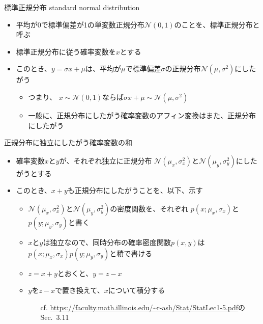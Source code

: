 \documentclass[aspectratio=169,unicode,dvipdfmx,14pt]{beamer}
\begin{document}
\begin{frame}{標準正規分布 standard normal distribution}
\begin{itemize}
\item 平均が0で標準偏差が1の単変数正規分布$\mathcal{N}(0,1)$のことを、標準正規分布と呼ぶ
\item 標準正規分布に従う確率変数を$x$とする
\item このとき、$y=\sigma x+\mu$は、平均が$\mu$で標準偏差$\sigma$の正規分布$\mathcal{N}(\mu,\sigma^2)$にしたがう
\begin{itemize}
\item つまり、 $x\sim\mathcal{N}(0,1)$ならば$\sigma x + \mu\sim\mathcal{N}(\mu,\sigma^2)$
\item 一般に、正規分布にしたがう確率変数のアフィン変換はまた、正規分布にしたがう
\end{itemize}
\end{itemize}
\end{frame}

\begin{frame}{正規分布に独立にしたがう確率変数の和}
\begin{itemize}
\item 確率変数$x$と$y$が、それぞれ独立に正規分布
$\mathcal{N}(\mu_x,\sigma_x^2)$と$\mathcal{N}(\mu_y,\sigma_y^2)$にしたがうとする
\item このとき、$x+y$も正規分布にしたがうことを、以下、示す
\begin{itemize}
\item $\mathcal{N}(\mu_x,\sigma_x^2)$と$\mathcal{N}(\mu_y,\sigma_y^2)$の密度関数を、それぞれ
$p(x;\mu_x,\sigma_x)$と$p(y;\mu_y,\sigma_y)$と書く
\item $x$と$y$は独立なので、同時分布の確率密度関数$p(x,y)$は$p(x;\mu_x,\sigma_x)p(y;\mu_y,\sigma_y)$と積で書ける
\item $z=x+y$とおくと、$y=z-x$
\item $y$を$z-x$で置き換えて、$x$について積分する
\begin{itemize}
\item[cf.] {\scriptsize \href{https://faculty.math.illinois.edu/\~r-ash/Stat/StatLec1-5.pdf}{\url{https://faculty.math.illinois.edu/~r-ash/Stat/StatLec1-5.pdf}}のSec.~3.11}
\end{itemize}
\end{itemize}
\end{itemize}
\end{frame}
\end{document}
